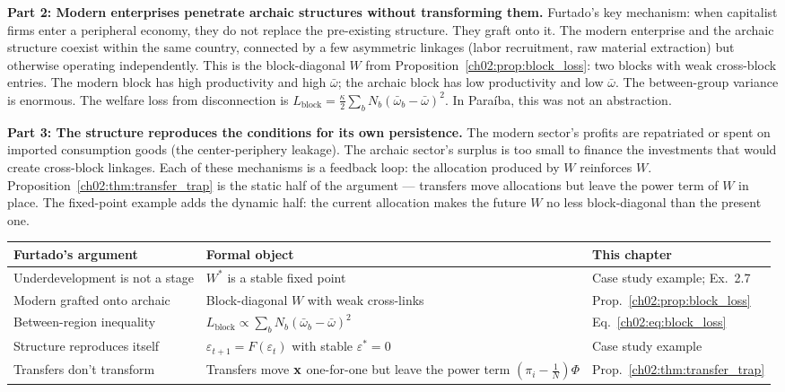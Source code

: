 \documentclass[../structural_economics_book.tex]{subfiles}
\begin{document}
\textbf{Part 2: Modern enterprises penetrate archaic structures without transforming them.} Furtado's key mechanism: when capitalist firms enter a peripheral economy, they do not replace the pre-existing structure. They graft onto it. The modern enterprise and the archaic structure coexist within the same country, connected by a few asymmetric linkages (labor recruitment, raw material extraction) but otherwise operating independently. This is the block-diagonal $W$ from Proposition~\ref{ch02:prop:block_loss}: two blocks with weak cross-block entries. The modern block has high productivity and high $\bar{\omega}$; the archaic block has low productivity and low $\bar{\omega}$. The between-group variance is enormous. The welfare loss from disconnection is $L_{\text{block}} = \frac{\kappa}{2}\sum_b N_b(\bar{\omega}_b - \bar{\omega})^2$. In Para\'{i}ba, this was not an abstraction.

\textbf{Part 3: The structure reproduces the conditions for its own persistence.} The modern sector's profits are repatriated or spent on imported consumption goods (the center-periphery leakage). The archaic sector's surplus is too small to finance the investments that would create cross-block linkages. Each of these mechanisms is a feedback loop: the allocation produced by $W$ reinforces $W$. Proposition~\ref{ch02:thm:transfer_trap} is the static half of the argument --- transfers move allocations but leave the power term of $W$ in place. The fixed-point example adds the dynamic half: the current allocation makes the future $W$ no less block-diagonal than the present one.

\begin{center}
\begin{tabularx}{\textwidth}{LLL}
\toprule
\textbf{Furtado's argument} & \textbf{Formal object} & \textbf{This chapter} \\
\midrule
Underdevelopment is not a stage & $W^*$ is a stable fixed point & Case study example; Ex.~2.7 \\
Modern grafted onto archaic & Block-diagonal $W$ with weak cross-links & Prop.~\ref{ch02:prop:block_loss} \\
Between-region inequality & $L_{\text{block}} \propto \sum_b N_b(\bar{\omega}_b - \bar{\omega})^2$ & Eq.~\eqref{ch02:eq:block_loss} \\
Structure reproduces itself & $\varepsilon_{t+1} = F(\varepsilon_t)$ with stable $\varepsilon^* = 0$ & Case study example \\
Transfers don't transform & Transfers move $\mathbf{x}$ one-for-one but leave the power term $(\pi_i - \frac1N)\Phi$ & Prop.~\ref{ch02:thm:transfer_trap} \\
\bottomrule
\end{tabularx}
\end{center}
\end{document}
